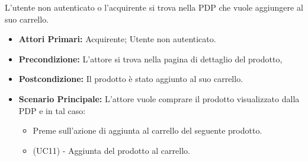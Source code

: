 L'utente non autenticato o l'acquirente si trova nella PDP che vuole aggiungere al suo carrello.
\begin{itemize}
    \item \textbf{Attori Primari:} Acquirente; Utente non autenticato.
    \item \textbf{Precondizione:} L'attore si trova nella pagina di dettaglio del prodotto,
    \item \textbf{Postcondizione:} Il prodotto è stato aggiunto al suo carrello.
    \item \textbf{Scenario Principale:} L'attore vuole comprare il prodotto visualizzato dalla PDP e in tal caso:
    \begin{itemize}
        \item Preme sull'azione di aggiunta al carrello del seguente prodotto.
        \item (UC11) - Aggiunta del prodotto al carrello.
    \end{itemize}
\end{itemize}
